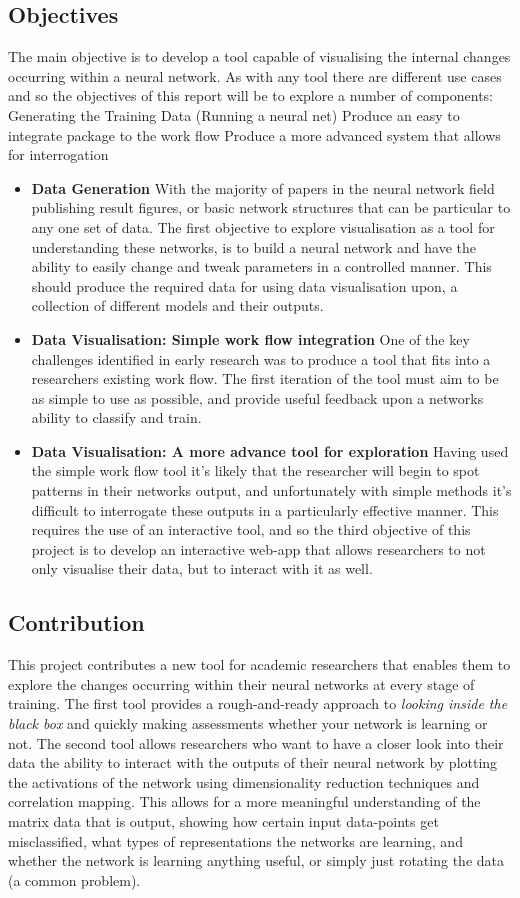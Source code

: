 \documentclass[a4paper,11pt,titlepage]{article}
\begin{document}
	\subsection{Objectives}
	The main objective is to develop a tool capable of visualising the internal changes occurring within a neural network. As with any tool there are different use cases and so the objectives of this report will be to explore a number of components:
	Generating the Training Data (Running a neural net)
Produce an easy to integrate package to the work flow
Produce a more advanced system that allows for interrogation
		\begin{itemize}
			\item \textbf{Data Generation} With the majority of papers in the neural network field publishing result figures, or basic network structures that can be particular to any one set of data. The first objective to explore visualisation as a tool for understanding these networks, is to build a neural network and have the ability to easily change and tweak parameters in a controlled manner. This should produce the required data for using data visualisation upon, a collection of different models and their outputs. 
			\item \textbf{Data Visualisation: Simple work flow integration} One of the key challenges identified in early research was to produce a tool that fits into a researchers existing work flow. The first iteration of the tool must aim to be as simple to use as possible, and provide useful feedback upon a networks ability to classify and train.
			\item \textbf{Data Visualisation: A more advance tool for exploration} Having used the simple work flow tool it's likely that the researcher will begin to spot patterns in their networks output, and unfortunately with simple methods it's difficult to interrogate these outputs in a particularly effective manner. This requires the use of an interactive tool, and so the third objective of this project is to develop an interactive web-app that allows researchers to not only visualise their data, but to interact with it as well.
		\end{itemize}

	\subsection{Contribution}
	This project contributes a new tool for academic researchers that enables them to explore the changes occurring within their neural networks at every stage of training. The first tool provides a rough-and-ready approach to \textit{looking inside the black box} and quickly making assessments whether your network is learning or not. The second tool allows researchers who want to have a closer look into their data the ability to interact with the outputs of their neural network by plotting the activations of the network using dimensionality reduction techniques and correlation mapping. This allows for a more meaningful understanding of the matrix data that is output, showing how certain input data-points get misclassified, what types of representations the networks are learning, and whether the network is learning anything useful, or simply just rotating the data (a common problem).
	
\end{document}
